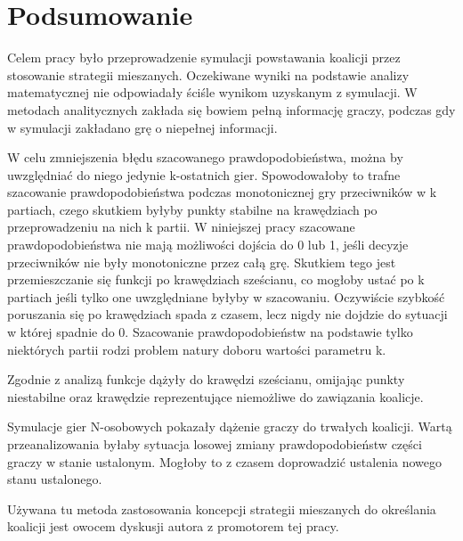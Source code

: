 \chapter{Podsumowanie}
\label{cha:podsumowanie}

Celem pracy było przeprowadzenie symulacji  powstawania koalicji przez stosowanie strategii mieszanych. Oczekiwane wyniki na podstawie analizy matematycznej nie odpowiadały ściśle wynikom uzyskanym z symulacji. W metodach analitycznych zakłada się bowiem pełną informację graczy, podczas gdy w symulacji zakładano grę o niepełnej informacji. 

W celu zmniejszenia błędu szacowanego prawdopodobieństwa, można by uwzględniać do niego jedynie k-ostatnich gier. Spowodowałoby to trafne szacowanie prawdopodobieństwa podczas monotonicznej gry przeciwników w k partiach, czego skutkiem byłyby punkty stabilne na krawędziach po przeprowadzeniu na nich k partii. W niniejszej pracy szacowane prawdopodobieństwa nie mają możliwości dojścia do 0 lub 1, jeśli decyzje przeciwników nie były monotoniczne przez całą grę. Skutkiem tego jest przemieszczanie się funkcji po krawędziach sześcianu, co mogłoby ustać po k partiach jeśli tylko one uwzględniane byłyby w szacowaniu. Oczywiście szybkość poruszania się po krawędziach spada z czasem, lecz nigdy nie dojdzie do sytuacji w której spadnie do 0. Szacowanie prawdopodobieństw na podstawie tylko niektórych partii rodzi problem natury doboru wartości parametru k. 

Zgodnie z analizą funkcje dążyły do krawędzi sześcianu, omijając punkty niestabilne oraz krawędzie reprezentujące niemożliwe do zawiązania koalicje.

Symulacje gier N-osobowych pokazały dążenie graczy do trwałych koalicji. Wartą przeanalizowania byłaby sytuacja losowej zmiany prawdopodobieństw części graczy w stanie ustalonym. Mogłoby to z czasem doprowadzić ustalenia nowego stanu ustalonego.

Używana tu metoda zastosowania koncepcji strategii mieszanych do określania koalicji jest owocem dyskusji autora z promotorem tej pracy.
